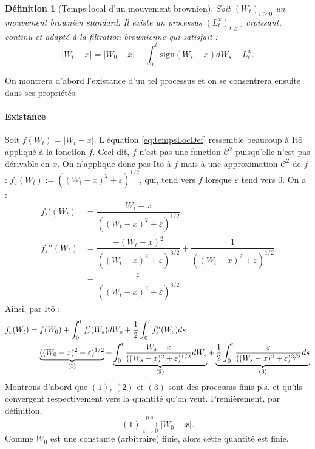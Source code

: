 \documentclass[openany]{book}
\makeatletter
\newcommand{\1}{\mathbbm{1}}
\newcommand{\sign}{\text{sign}}
\renewenvironment{proof}[1][\textbf{\textit{Démonstration}}]{%
  \par\pushQED{\qed}%
  \normalfont\topsep6\p@\@plus6\p@\relax
  \trivlist\item[\hskip\labelsep
    #1\@addpunct{.}]\ignorespaces
}{%
  \popQED\endtrivlist\@endpefalse
}
\theoremstyle{thmfont}
\theoremstyle{deffont}
\newtheorem{definition}[definition]{Définition}
\theoremstyle{thmfont}
\theoremstyle{deffont}
\makeatother
\begin{document}
\begin{definition}[Temps local d'un mouvement brownien]
  \label{def:TempsLoc}
  Soit $(W_t)_{t\geq0}$ un mouvement brownien standard. Il existe un processus $(L_t^x)_{t\geq0}$ croissant, continu et adapté à la filtration brownienne qui satisfait :
  \begin{equation}
    |W_t -x|  = |W_0-x| + \int_0^t\sign(W_s - x)dW_s + L_t^x.
    \label{eq:tempsLocDef}
  \end{equation}
\end{definition}

\begin{proof} On montrera d'abord l'existance d'un tel processus et on se consentrera ensuite dans ses propriétés.

  \paragraph{Existance}
  Soit $f(W_t) = |W_t-x|$. L'équation \eqref{eq:tempsLocDef} ressemble beaucoup à Itō appliqué à la fonction $f$. Ceci dit, $f$ n'est pas une fonction $\mathcal C^2$ puisqu'elle n'est pas dérivable en $x$. On n'applique donc pas Itō à $f$ mais à une approximation $\mathcal C^2$ de $f$ : $f_\varepsilon(W_t):= ((W_t-x)^2 +\varepsilon)^{1/2}$, qui, tend vers $f$ lorsque $\varepsilon$ tend vers 0. On a :
  \begin{align*}
    f_\varepsilon'(W_t) &= \dfrac{W_t-x}{((W_t-x)^2 +\varepsilon)^{1/2}}\\
    f_\varepsilon''(W_t)&= \dfrac{-(W_t-x)^2}{((W_t-x)^2 +\varepsilon)^{3/2}} + \dfrac{1}{((W_t-x)^2 +\varepsilon)^{1/2}}\\
              &= \dfrac{\varepsilon}{((W_t-x)^2 +\varepsilon)^{3/2}}
  \end{align*}
  Ainsi, par Itō :
  \begin{align}
    f_\varepsilon(W_t) &= f(W_0) + \int_0^t f_\varepsilon'(W_s) dW_s + \dfrac{1}{2} \int_0^t f_\varepsilon''(W_s) ds\label{eq:tempsLocApprox}\\
             &= \underbrace{((W_0 -x)^2 + \varepsilon)^{1/2}}_{(1)} + \underbrace{\int_0^t \dfrac{W_s-x}{((W_s-x)^2 +\varepsilon)^{1/2}}dW_s}_{(2)} + \underbrace{\dfrac{1}{2} \int_0^t \dfrac{\varepsilon}{((W_s-x)^2 +\varepsilon)^{3/2}} ds}_{(3)} \notag
  \end{align}
  Montrons d'abord que $(1)$, $(2)$ et $(3)$ sont des processus finis p.s. et qu'ils convergent respectivement vers la quantité qu'on veut. Premièrement, par définition,
  $$(1) \xrightarrow[\varepsilon \to 0]{p.s.}  |W_0 -x|.$$
  \noindent Comme $W_0$ est une constante (arbitraire) finie, alors cette quantité est finie.\\


\end{proof}
\end{document}
